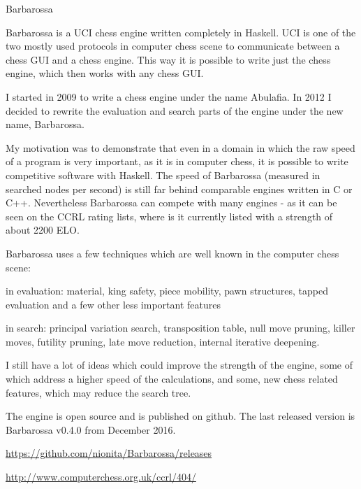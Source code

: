 \begin{hcarentry}[updated]{Barbarossa}
\makeheader

Barbarossa is a UCI chess engine written completely in Haskell. UCI is one of
the two mostly used protocols in computer chess scene to communicate between a
chess GUI and a chess engine. This way it is possible to write just the chess engine,
which then works with any chess GUI.

I started in 2009 to write a chess engine under the name Abulafia. In 2012 I
decided to rewrite the evaluation and search parts of the engine under the new
name, Barbarossa.

My motivation was to demonstrate that even in a domain in which the raw speed
of a program is very important, as it is in computer chess, it is possible to
write competitive software with Haskell. The speed of Barbarossa (measured in
searched nodes per second) is still far behind comparable engines written in C
or C++. Nevertheless Barbarossa can compete with many engines - as it can be
seen on the CCRL rating lists, where is it currently listed with a strength
of about 2200 ELO.

Barbarossa uses a few techniques which are well known in the computer chess scene:
\begin{compactitem}
\item in evaluation: material, king safety, piece mobility, pawn structures,
tapped evaluation and a few other less important features
\item in search: principal variation search, transposition table, null move
pruning, killer moves, futility pruning, late move reduction, internal
iterative deepening.
\end{compactitem}

I still have a lot of ideas which could improve the strength of the engine,
some of which address a higher speed of the calculations, and some, new chess
related features, which may reduce the search tree.

The engine is open source and is published on github. The last released version
is Barbarossa v0.4.0 from December 2016.

\FurtherReading
\begin{compactitem}
\item\url{https://github.com/nionita/Barbarossa/releases}
\item\url{http://www.computerchess.org.uk/ccrl/404/}
\end{compactitem}
\end{hcarentry}
